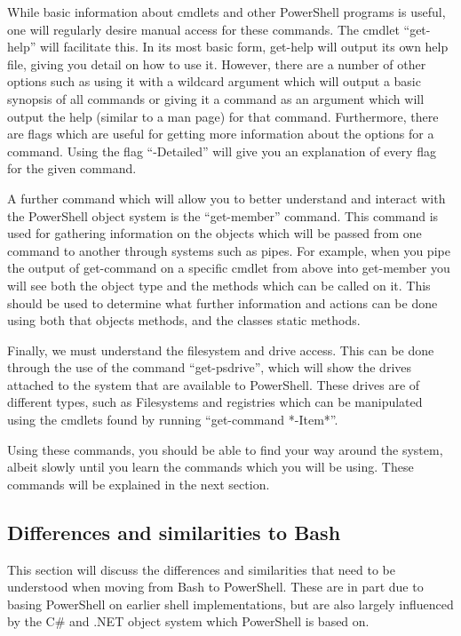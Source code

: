 			While basic information about cmdlets and other PowerShell programs is useful, one will regularly desire manual access for these commands.
			The cmdlet ``get-help'' will facilitate this.
			In its most basic form, get-help will output its own help file, giving you detail on how to use it.
			However, there are a number of other options such as using it with a wildcard argument which will output a basic synopsis of all commands or giving it a command as an argument which will output the help (similar to a man page) for that command.
			Furthermore, there are flags which are useful for getting more information about the options for a command.
			Using the flag ``-Detailed'' will give you an explanation of every flag for the given command.

			A further command which will allow you to better understand and interact with the PowerShell object system is the ``get-member'' command.
			This command is used for gathering information on the objects which will be passed from one command to another through systems such as pipes.
			For example, when you pipe the output of get-command on a specific cmdlet from above into get-member you will see both the object type and the methods which can be called on it.
			This should be used to determine what further information and actions can be done using both that objects methods, and the classes static methods.

			Finally, we must understand the filesystem and drive access.
			This can be done through the use of the command ``get-psdrive'', which will show the drives attached to the system that are available to PowerShell.
			These drives are of different types, such as Filesystems and registries which can be manipulated using the cmdlets found by running ``get-command *-Item*''.

			Using these commands, you should be able to find your way around the system, albeit slowly until you learn the commands which you will be using.
			These commands will be explained in the next section.

		\subsection{Differences and similarities to Bash}
			This section will discuss the differences and similarities that need to be understood when moving from Bash to PowerShell.
			These are in part due to basing PowerShell on earlier shell implementations, but are also largely influenced by the C\# and .NET object system which PowerShell is based on.

